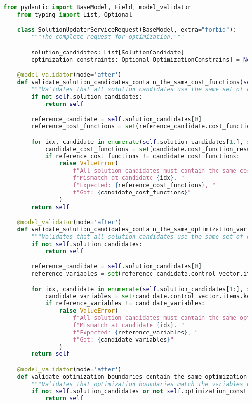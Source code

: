 \begin{lstlisting}[language=Python, caption={SolutionUpdaterServiceRequest model with complex validation logic}]
	from pydantic import BaseModel, Field, model_validator
	from typing import List, Optional

	class SolutionUpdaterServiceRequest(BaseModel, extra="forbid"):
		"""The complete request for optimization."""

		solution_candidates: List[SolutionCandidate]
		optimization_constraints: Optional[OptimizationConstrains] = None

	@model_validator(mode='after')
	def validate_solution_candidates_contain_the_same_cost_functions(self) -> 'SolutionUpdaterServiceRequest':
		"""Validates that all solution candidates use the same set of cost functions."""
		if not self.solution_candidates:
			return self

		reference_candidate = self.solution_candidates[0]
		reference_cost_functions = set(reference_candidate.cost_function_results.values.keys())

		for idx, candidate in enumerate(self.solution_candidates[1:], start=1):
			candidate_cost_functions = set(candidate.cost_function_results.values.keys())
			if reference_cost_functions != candidate_cost_functions:
				raise ValueError(
					f"All solution candidates must contain the same cost functions. "
					f"Mismatch at candidate {idx}. "
					f"Expected: {reference_cost_functions}, "
					f"Got: {candidate_cost_functions}"
				)
		return self

	@model_validator(mode='after')
	def validate_solution_candidates_contain_the_same_optimization_variables(self) -> 'SolutionUpdaterServiceRequest':
		"""Validates that all solution candidates use the same set of optimization variables."""
		if not self.solution_candidates:
			return self

		reference_candidate = self.solution_candidates[0]
		reference_variables = set(reference_candidate.control_vector.items.keys())

		for idx, candidate in enumerate(self.solution_candidates[1:], start=1):
			candidate_variables = set(candidate.control_vector.items.keys())
			if reference_variables != candidate_variables:
				raise ValueError(
					f"All solution candidates must contain the same optimization variables. "
					f"Mismatch at candidate {idx}. "
					f"Expected: {reference_variables}, "
					f"Got: {candidate_variables}"
				)
		return self

	@model_validator(mode='after')
	def validate_optimization_boundaries_contain_the_same_optimization_variables(self) -> 'SolutionUpdaterServiceRequest':
		"""Validates that optimization boundaries match the variables used in solutions."""
		if not self.solution_candidates or not self.optimization_constraints:
			return self


\end{lstlisting}
